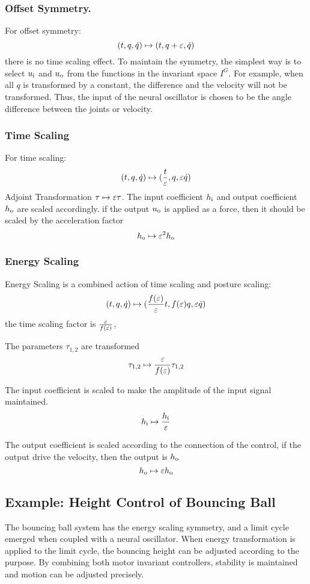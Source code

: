 \subsubsection*{ Offset Symmetry.}
For offset symmetry:
\[
(t,q,\dot{q}) \mapsto (t,q+\varepsilon,\dot{q})
\]
there is no time scaling effect.
To maintain the symmetry,  the simplest way is to select $u_{\mathrm{i}}$ and $u_{\mathrm{o}}$ from the functions in the invariant space $I^G$.
For example, when all  $q$ is transformed by a constant, the difference and the velocity will not be transformed. 
Thus, the input of the neural oscillator is chosen to be the angle difference between the joints or velocity.



\subsubsection*{Time Scaling}
For time scaling:
\[
(t,q,\dot{q}) \mapsto (\frac{t}{\varepsilon},q,\varepsilon \dot{q})
\]
Adjoint Transformation
$\tau \mapsto \varepsilon \tau $.
The input coefficient $h_{\mathrm{i}}$ and output coefficient $h_{\mathrm{o}}$ are scaled accordingly.
if the output $u_{\mathrm{o}}$ is applied as a force, then it should be scaled by the acceleration factor
\[
 h_{\mathrm{o}} \mapsto \varepsilon^2 h_{\mathrm{o}}
\]
\subsubsection*{ Energy Scaling}
Energy Scaling is a combined action of time scaling and posture scaling:
\[
(t,q,\dot{q} ) \mapsto ( \frac{f(\varepsilon)}{\varepsilon}t ,f(\varepsilon)q,\varepsilon\dot{q})
\]
the time scaling factor is $\frac{\varepsilon}{f(\varepsilon)}$, 

The parameters $\tau_{1,2}$ are transformed
\[
\tau_{1,2} \mapsto \frac{\varepsilon}{f(\varepsilon)} \tau_{1,2}
\]

The input coefficient is scaled to make the amplitude of the input signal maintained.
\[
h_{\mathrm{i}} \mapsto \frac{h_{\mathrm{i}}}{\varepsilon}
\]

The output coefficient is scaled according to the connection of the control, 
if the output drive the velocity, then the output is $h_{\mathrm{o}}$
\[
h_{\mathrm{o}} \mapsto \varepsilon h_{\mathrm{o}}
\]




\subsection{Example: Height Control of Bouncing Ball}

The bouncing ball system has the energy scaling symmetry, and a limit cycle emerged when coupled with a neural oscillator.
When energy transformation is applied to the limit cycle, the bouncing height can be adjusted according to the purpose.
By combining both motor invariant controllers, stability is maintained and motion can be adjusted precisely. 

